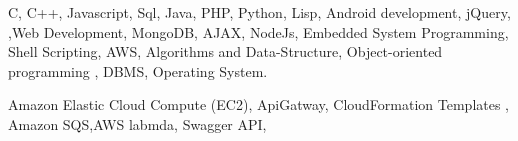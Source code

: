 



\begin{cventries}

\cvproject
{
    \begin{cvitems} %
        \item {C, C++, Javascript, Sql, Java, PHP, Python, Lisp, Android development, jQuery, ,Web Development, MongoDB, AJAX, NodeJs, Embedded System Programming, Shell Scripting, AWS, Algorithms and Data-Structure, Object-oriented programming , DBMS, Operating System.}
        \item { Amazon Elastic Cloud Compute (EC2), ApiGatway, CloudFormation Templates , Amazon SQS,AWS labmda, Swagger API, }
        \end{cvitems}
}

\end{cventries}